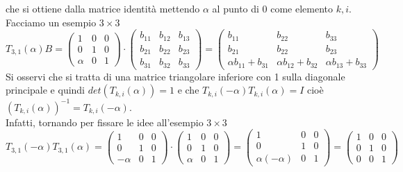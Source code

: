 \documentclass[12pt,a4paper]{article}
\begin{document}
che si ottiene dalla matrice identità mettendo $\alpha$ al punto di 0 come elemento $k,i$.\\Facciamo un esempio $3\times 3$
\begin{equation*}
    T_{3,1}(\alpha)B=
    \begin{pmatrix}
        1 & 0 & 0 \\
        0 & 1 & 0 \\
        \alpha & 0 & 1
    \end{pmatrix} \cdot \begin{pmatrix}
        b_{11} & b_{12} & b_{13} \\
        b_{21} & b_{22} & b_{23} \\
        b_{31} & b_{32} & b_{33}
    \end{pmatrix}=\begin{pmatrix}
        b_{11} & b_{22} & b_{33} \\
        b_{21} & b_{22} & b_{23} \\
        \alpha b_{11}+b_{31} & \alpha b_{12}+b_{32} & \alpha b_{13}+b_{33}
    \end{pmatrix}
\end{equation*}
Si osservi che si tratta di una matrice triangolare inferiore con 1 sulla diagonale principale e quindi $det(T_{k,i}(\alpha))=1$ e che $T_{k,i}(-\alpha)T_{k,i}(\alpha)= I$ cioè $(T_{k,i}(\alpha))^{-1}=T_{k,i}(-\alpha)$.\\Infatti, tornando per fissare le idee all'esempio $3\times 3$
\begin{equation*}
    T_{3,1}(-\alpha)T_{3,1}(\alpha)=
    \begin{pmatrix}
        1 & 0 & 0 \\
        0 & 1 & 0 \\
        -\alpha & 0 & 1
    \end{pmatrix} \cdot \begin{pmatrix}
        1 & 0 & 0 \\
        0 & 1 & 0 \\
        \alpha & 0 & 1
    \end{pmatrix}=\begin{pmatrix}
        1 & 0 & 0 \\
        0 & 1 & 0 \\
        \alpha(-\alpha) & 0 & 1
    \end{pmatrix}=\begin{pmatrix}
        1 & 0 & 0 \\
        0 & 1 & 0 \\
        0 & 0 & 1
    \end{pmatrix}
\end{equation*}
\end{document}
